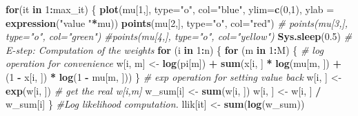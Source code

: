 \documentclass[
]{article}
\newenvironment{Shaded}{\begin{snugshade}}{\end{snugshade}}
\newcommand{\AttributeTok}[1]{\textcolor[rgb]{0.13,0.29,0.53}{#1}}
\newcommand{\CommentTok}[1]{\textcolor[rgb]{0.56,0.35,0.01}{\textit{#1}}}
\newcommand{\ControlFlowTok}[1]{\textcolor[rgb]{0.13,0.29,0.53}{\textbf{#1}}}
\newcommand{\DecValTok}[1]{\textcolor[rgb]{0.00,0.00,0.81}{#1}}
\newcommand{\FloatTok}[1]{\textcolor[rgb]{0.00,0.00,0.81}{#1}}
\newcommand{\FunctionTok}[1]{\textcolor[rgb]{0.13,0.29,0.53}{\textbf{#1}}}
\newcommand{\NormalTok}[1]{#1}
\newcommand{\OtherTok}[1]{\textcolor[rgb]{0.56,0.35,0.01}{#1}}
\newcommand{\SpecialCharTok}[1]{\textcolor[rgb]{0.81,0.36,0.00}{\textbf{#1}}}
\newcommand{\StringTok}[1]{\textcolor[rgb]{0.31,0.60,0.02}{#1}}
\begin{document}
\begin{Shaded}
\begin{Highlighting}[]
\ControlFlowTok{for}\NormalTok{(it }\ControlFlowTok{in} \DecValTok{1}\SpecialCharTok{:}\NormalTok{max\_it) \{}
  \FunctionTok{plot}\NormalTok{(mu[}\DecValTok{1}\NormalTok{,], }\AttributeTok{type=}\StringTok{"o"}\NormalTok{, }\AttributeTok{col=}\StringTok{"blue"}\NormalTok{, }\AttributeTok{ylim=}\FunctionTok{c}\NormalTok{(}\DecValTok{0}\NormalTok{,}\DecValTok{1}\NormalTok{), }\AttributeTok{ylab =} \FunctionTok{expression}\NormalTok{(}\StringTok{"value "}\SpecialCharTok{*}\NormalTok{mu))}
  \FunctionTok{points}\NormalTok{(mu[}\DecValTok{2}\NormalTok{,], }\AttributeTok{type=}\StringTok{"o"}\NormalTok{, }\AttributeTok{col=}\StringTok{"red"}\NormalTok{)}
 \CommentTok{\# points(mu[3,], type="o", col="green")}
  \CommentTok{\#points(mu[4,], type="o", col="yellow")}
  \FunctionTok{Sys.sleep}\NormalTok{(}\FloatTok{0.5}\NormalTok{)}
  \CommentTok{\# E{-}step: Computation of the weights}
  \ControlFlowTok{for}\NormalTok{ (i }\ControlFlowTok{in} \DecValTok{1}\SpecialCharTok{:}\NormalTok{n) \{}
    \ControlFlowTok{for}\NormalTok{ (m }\ControlFlowTok{in} \DecValTok{1}\SpecialCharTok{:}\NormalTok{M) \{}
      \CommentTok{\# log operation for convenience}
\NormalTok{      w[i, m] }\OtherTok{\textless{}{-}} \FunctionTok{log}\NormalTok{(pi[m]) }\SpecialCharTok{+} \FunctionTok{sum}\NormalTok{(x[i, ] }\SpecialCharTok{*} \FunctionTok{log}\NormalTok{(mu[m, ]) }\SpecialCharTok{+}\NormalTok{ (}\DecValTok{1} \SpecialCharTok{{-}}\NormalTok{ x[i, ]) }\SpecialCharTok{*} \FunctionTok{log}\NormalTok{(}\DecValTok{1} \SpecialCharTok{{-}}\NormalTok{ mu[m, ]))}
\NormalTok{    \}}
    \CommentTok{\# exp operation for setting value back}
\NormalTok{    w[i, ] }\OtherTok{\textless{}{-}} \FunctionTok{exp}\NormalTok{(w[i, ])}
    \CommentTok{\# get the real w[i,m]}
\NormalTok{    w\_sum[i] }\OtherTok{\textless{}{-}} \FunctionTok{sum}\NormalTok{(w[i, ])}
\NormalTok{    w[i, ] }\OtherTok{\textless{}{-}}\NormalTok{ w[i, ] }\SpecialCharTok{/}\NormalTok{ w\_sum[i]}
\NormalTok{  \}}
  \CommentTok{\#Log likelihood computation.}
\NormalTok{  llik[it] }\OtherTok{\textless{}{-}} \FunctionTok{sum}\NormalTok{(}\FunctionTok{log}\NormalTok{(w\_sum))}
  

\end{Highlighting}
\end{Shaded}
\end{document}
